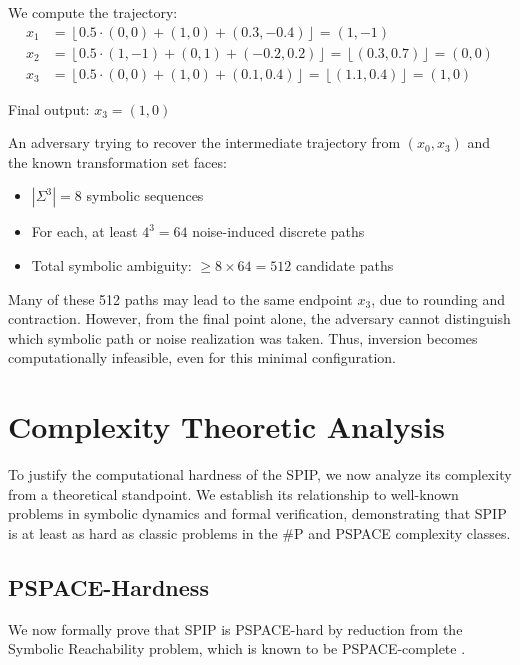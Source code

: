 \documentclass[twocolumn,10pt]{article}
\begin{document}
We compute the trajectory:
\begin{align*}
x_1 &= \left\lfloor 0.5 \cdot (0, 0) + (1, 0) + (0.3, -0.4) \right\rfloor = (1, -1) \\
x_2 &= \left\lfloor 0.5 \cdot (1, -1) + (0, 1) + (-0.2, 0.2) \right\rfloor = \left\lfloor (0.3, 0.7) \right\rfloor = (0, 0) \\
x_3 &= \left\lfloor 0.5 \cdot (0, 0) + (1, 0) + (0.1, 0.4) \right\rfloor = \left\lfloor (1.1, 0.4) \right\rfloor = (1, 0)
\end{align*}

Final output: $x_3 = (1, 0)$


An adversary trying to recover the intermediate trajectory from $(x_0, x_3)$ and the known transformation set faces:
\begin{itemize}
  \item $|\Sigma^3| = 8$ symbolic sequences
  \item For each, at least $4^3 = 64$ noise-induced discrete paths
  \item Total symbolic ambiguity: $\geq 8 \times 64 = 512$ candidate paths
\end{itemize}

Many of these 512 paths may lead to the same endpoint $x_3$, due to rounding and contraction. However, from the final point alone, the adversary cannot distinguish which symbolic path or noise realization was taken. Thus, inversion becomes computationally infeasible, even for this minimal configuration.




\section{Complexity Theoretic Analysis} \label{sec:complexity}
\vspace{0.8em}

To justify the computational hardness of the SPIP, we now analyze its complexity from a theoretical standpoint. We establish its relationship to well-known problems in symbolic dynamics and formal verification, demonstrating that SPIP is at least as hard as classic problems in the \#P and PSPACE complexity classes.

\subsection{PSPACE-Hardness}

We now formally prove that SPIP is PSPACE-hard by reduction from the Symbolic Reachability problem, which is known to be PSPACE-complete \cite{arora2009computational}.
\end{document}
